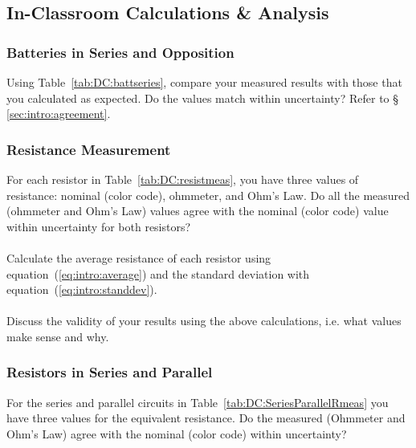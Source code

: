 \subsection{In-Classroom Calculations \& Analysis}

\noindent
\subsubsection{Batteries in Series and Opposition}

\noindent Using Table~\ref{tab:DC:battseries}, compare your measured results 
with those that you calculated as expected.
Do the values match within uncertainty? Refer to § \ref{sec:intro:agreement}. \\
\vspace*{2cm}%

\subsubsection{Resistance Measurement}
\noindent For each resistor in Table~\ref{tab:DC:resistmeas}, you have three 
values of resistance: nominal (color 
code), ohmmeter, and Ohm's Law.  Do all the measured (ohmmeter and Ohm's
Law) values agree with the nominal (color code) 
value within uncertainty for both resistors? \\
\vspace*{4cm}\\
\noindent Calculate the average resistance of each resistor using 
equation~(\ref{eq:intro:average}) and the standard deviation with 
equation~(\ref{eq:intro:standdev}).\\  
\vspace*{4cm}\\
\noindent Discuss the validity of your results using the above calculations,
i.e. what values make sense and why.  \\


\subsubsection{Resistors in Series and Parallel}

\noindent For the series and parallel circuits in 
Table~\ref{tab:DC:SeriesParallelRmeas} you have three values for the
equivalent resistance.  Do the measured (Ohmmeter and Ohm's Law)
agree with the nominal (color code) within uncertainty? \\
\\ 
\vspace*{1cm} \\
\\ 
\vspace*{1.3cm} \\

